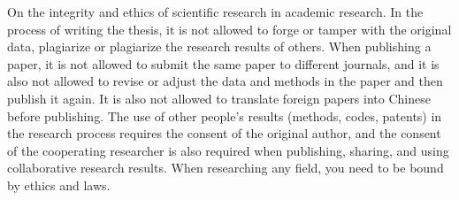 \documentclass[UTF-8]{ctexart}
\begin{document}
On the integrity and ethics of scientific research in academic research. In the process of writing the thesis, it is not allowed to forge or tamper with the original data, plagiarize or plagiarize the research results of others. When publishing a paper, it is not allowed to submit the same paper to different journals, and it is also not allowed to revise or adjust the data and methods in the paper and then publish it again. It is also not allowed to translate foreign papers into Chinese before publishing. The use of other people's results (methods, codes, patents) in the research process requires the consent of the original author, and the consent of the cooperating researcher is also required when publishing, sharing, and using collaborative research results. When researching any field, you need to be bound by ethics and laws.
\end{document}
